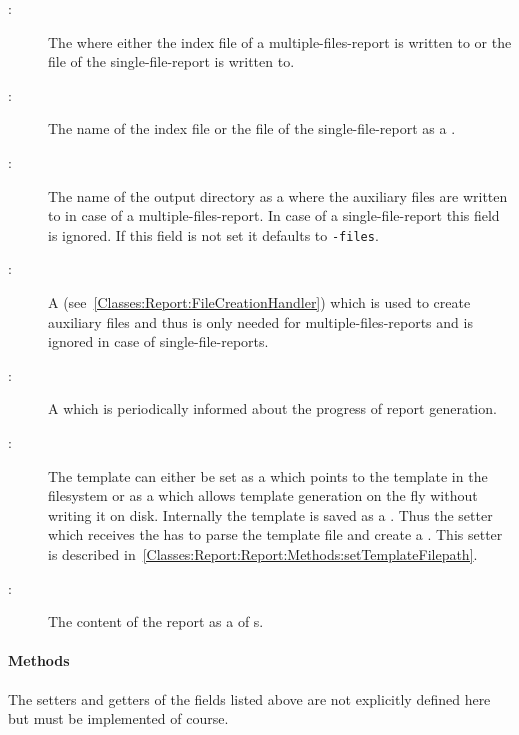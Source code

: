 \begin{description}
\item[:] The  where either the index file of a multiple-files-report is written to or the file of the single-file-report is written to.

\item[:] The name of the index file or the file of the single-file-report as a .

\item[:] The name of the output directory as a  where the auxiliary files are written to in case of a multiple-files-report. In case of a single-file-report this field is ignored. If this field is not set it defaults to \mbox{\texttt{-files}}.

\item[:] A  (see~\ref{Classes:Report:FileCreationHandler}) which is used to create auxiliary files and thus is only needed for multiple-files-reports and is ignored in case of single-file-reports.

\item[:] A  which is periodically informed about the progress of report generation.

\item[:] The template can either be set as a  which points to the template in the filesystem or as a  which allows template generation on the fly without writing it on disk. Internally the template is saved as a . Thus the setter which receives the  has to parse the template file and create a . This setter is described in~\ref{Classes:Report:Report:Methods:setTemplateFilepath}.

\item[:] The content of the report as a  of s.
\end{description}


\paragraph{Methods} \label{Classes:Report:Report:Methods}

The setters and getters of the fields listed above are not explicitly defined here but must be implemented of course.


